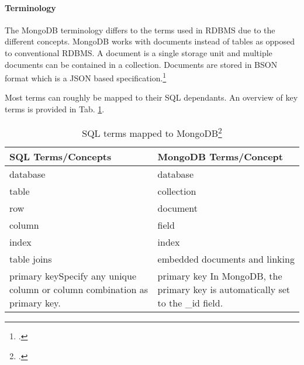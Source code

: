 \paragraph{Terminology}
The MongoDB terminology differs to the terms used in RDBMS due to the different
concepts. MongoDB works with documents instead of tables as opposed to conventional RDBMS.
A document is a single storage unit and multiple documents can be contained in a
collection. Documents are stored in BSON format which is a JSON based
specification.\footcite[Cf.][]{bson_spec}

Most terms can roughly be mapped to their SQL dependants. An overview of key terms
is provided in Tab. \ref{tab:sql-mongo-map}.

\begin{table}[ht]
\begin{tabular*}{0.95\textwidth}{p{} p{}}
\toprule
\textbf{SQL Terms/Concepts} & \textbf{MongoDB Terms/Concept}\\
\midrule 
database & 	database\\
table 	 &	collection\\
row 	 &	document\\
column 	 &	field\\
index 	 &	index\\
table joins &	embedded documents and linking\\
primary key\newline Specify any unique column or column combination as primary
key.
		&
primary key\newline
In MongoDB, the primary key is automatically set to the \_id field.\\

\bottomrule 
\end{tabular*}
  \begin{savenotes}
  \caption[SQL terms mapped to MongoDB]{SQL terms mapped to
  MongoDB\footcite[][]{mongo_sql_comp} }
  \label{tab:sql-mongo-map}
  \end{savenotes}
\end{table}


